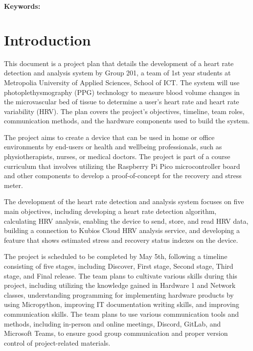 \documentclass{article}
\begin{document}
\begin{center}
\textbf{\large Keywords:}
\end{center}
\begin{bf}
\begin{center}
\end{center}
\end{bf}

\newpage

\tableofcontents

\newpage

\section{Introduction}

This document is a project plan that details the development of a heart rate detection and analysis system by Group 201, a team of 1st year students at Metropolia University of Applied Sciences, School of ICT. The system will use photoplethysmography (PPG) technology to measure blood volume changes in the microvascular bed of tissue to determine a user's heart rate and heart rate variability (HRV). The plan covers the project's objectives, timeline, team roles, communication methods, and the hardware components used to build the system.



The project aims to create a device that can be used in home or office environments by end-users or health and wellbeing professionals, such as physiotherapists, nurses, or medical doctors. The project is part of a course curriculum that involves utilizing the Raspberry Pi Pico microcontroller board and other components to develop a proof-of-concept for the recovery and stress meter.



The development of the heart rate detection and analysis system focuses on five main objectives, including developing a heart rate detection algorithm, calculating HRV analysis, enabling the device to send, store, and read HRV data, building a connection to Kubios Cloud HRV analysis service, and developing a feature that shows estimated stress and recovery status indexes on the device.



The project is scheduled to be completed by May 5th, following a timeline consisting of five stages, including Discover, First stage, Second stage, Third stage, and Final release. The team plans to cultivate various skills during this project, including utilizing the knowledge gained in Hardware 1 and Network classes, understanding programming for implementing hardware products by using Micropython, improving IT documentation writing skills, and improving communication skills. The team plans to use various communication tools and methods, including in-person and online meetings, Discord, GitLab, and Microsoft Teams, to ensure good group communication and proper version control of project-related materials.
\end{document}
